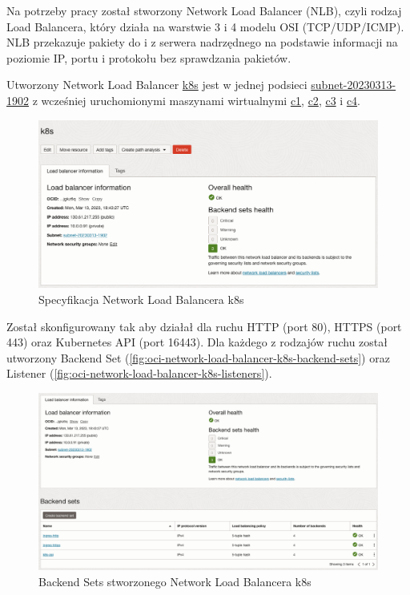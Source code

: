 Na potrzeby pracy został stworzony Network Load Balancer (NLB), czyli rodzaj Load Balancera, który działa na warstwie 3 i 4 modelu OSI (TCP/UDP/ICMP).
NLB przekazuje pakiety do i z serwera nadrzędnego na podstawie informacji na poziomie IP, portu i protokołu bez sprawdzania pakietów.

Utworzony Network Load Balancer \url{k8s} jest w jednej podsieci \url{subnet-20230313-1902} z wcześniej uruchomionymi maszynami wirtualnymi \url{c1}, \url{c2}, \url{c3} i \url{c4}.

\begin{figure}[H]
    \centering
    \includegraphics[width=\textwidth]{img/oci-network-load-balancer-k8s}
    \caption{Specyfikacja Network Load Balancera k8s}
    \label{fig:oci-network-load-balancer-k8s}
\end{figure}

Został skonfigurowany tak aby działał dla ruchu HTTP (port 80), HTTPS (port 443) oraz Kubernetes API (port 16443).
Dla każdego z rodzajów ruchu został utworzony Backend Set (\autoref{fig:oci-network-load-balancer-k8s-backend-sets}) oraz Listener (\autoref{fig:oci-network-load-balancer-k8s-listeners}).

\begin{figure}[H]
    \centering
    \includegraphics[width=\textwidth]{img/oci-network-load-balancer-k8s-backend-sets}
    \caption{Backend Sets stworzonego Network Load Balancera k8s}
    \label{fig:oci-network-load-balancer-k8s-backend-sets}
\end{figure}

